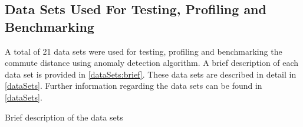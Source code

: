 \subsection{Data Sets Used For Testing, Profiling and Benchmarking}
\label{software:datasets}
A total of 21 data sets were used for testing, profiling and benchmarking the
commute distance using anomaly detection algorithm. A brief description of each
data set is provided in \autoref{dataSets:brief}. These data sets are
described in detail in \autoref{dataSets}. Further information regarding the
data sets can be found in \autoref{dataSets}.

\begin{table}
    \centering
    \begin{datasets}
    \end{datasets}
    \caption{Brief description of the data sets}
    \label{dataSets:brief}
\end{table}
